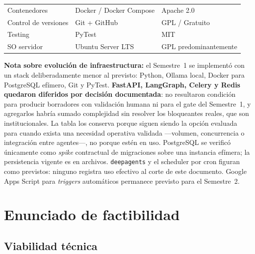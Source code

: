 \documentclass[a4paper, 12pt]{article}
\begin{document}
\begin{table}[H]
\begin{tabularx}{\textwidth}{l>{\raggedright\arraybackslash}Xl}
    Contenedores            & Docker / Docker Compose                   & Apache 2.0 \\
    Control de versiones    & Git + GitHub                              & GPL / Gratuito \\
    Testing                 & PyTest                                    & MIT \\
    SO servidor             & Ubuntu Server LTS                         & GPL predominantemente \\
    \bottomrule
  \end{tabularx}
\end{table}

\noindent\textbf{Nota sobre evoluci\'on de infraestructura:} el Semestre~1 se implement\'o con un stack deliberadamente menor al previsto: Python, Ollama local, Docker para PostgreSQL ef\'imero, Git y PyTest. \textbf{FastAPI, LangGraph, Celery y Redis quedaron diferidos por decisi\'on documentada}: no resultaron condici\'on para producir borradores con validaci\'on humana ni para el gate del Semestre~1, y agregarlos habr\'ia sumado complejidad sin resolver los bloqueantes reales, que son institucionales. La tabla los conserva porque siguen siendo la opci\'on evaluada para cuando exista una necesidad operativa validada ---volumen, concurrencia o integraci\'on entre agentes---, no porque est\'en en uso. PostgreSQL se verific\'o \'unicamente como \emph{spike} contractual de migraciones sobre una instancia ef\'imera; la persistencia vigente es en archivos. \texttt{deepagents} y el scheduler por cron figuran como previstos: ninguno registra uso efectivo al corte de este documento. Google Apps Script para \emph{triggers} autom\'aticos permanece previsto para el Semestre~2.

\section{Enunciado de factibilidad}
\label{sec:factibilidad}

\subsection{Viabilidad t\'ecnica}
\end{document}
